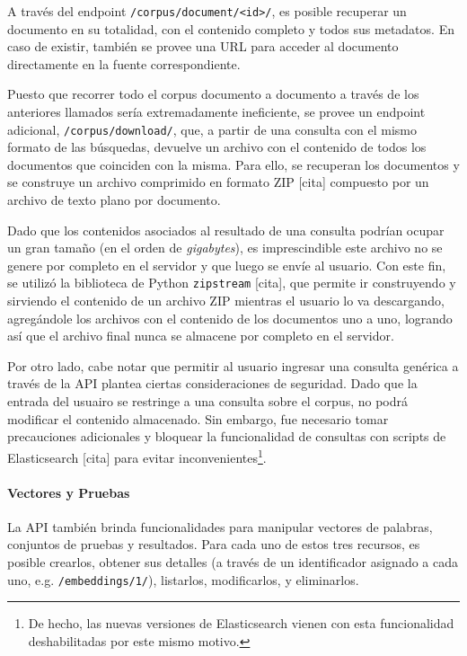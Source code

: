 A través del endpoint \texttt{/corpus/document/<id>/}, es posible recuperar un documento en su
totalidad, con el contenido completo y todos sus metadatos. En caso de existir, también se provee
una URL para acceder al documento directamente en la fuente correspondiente.

Puesto que recorrer todo el corpus documento a documento a través de los anteriores llamados sería
extremadamente ineficiente, se provee un endpoint adicional, \texttt{/corpus/download/}, que, a
partir de una consulta con el mismo formato de las búsquedas, devuelve un archivo con el contenido
de todos los documentos que coinciden con la misma. Para ello, se recuperan los documentos y se
construye un archivo comprimido en formato ZIP [cita] compuesto por un archivo de texto plano por
documento.

Dado que los contenidos asociados al resultado de una consulta podrían ocupar un gran tamaño (en el
orden de \textit{gigabytes}), es imprescindible este archivo no se genere por completo en el
servidor y que luego se envíe al usuario. Con este fin, se utilizó la biblioteca de Python
\texttt{zipstream} [cita], que permite ir construyendo y sirviendo el contenido de un archivo ZIP
mientras el usuario lo va descargando, agregándole los archivos con el contenido de los documentos
uno a uno, logrando así que el archivo final nunca se almacene por completo en el servidor.


Por otro lado, cabe notar que permitir al usuario ingresar una consulta genérica a través de la API
plantea ciertas consideraciones de seguridad. Dado que la entrada del usuairo se restringe a una
consulta sobre el corpus, no podrá modificar el contenido almacenado. Sin embargo, fue necesario
tomar precauciones adicionales y bloquear la funcionalidad de consultas con scripts de Elasticsearch
[cita] para evitar inconvenientes\footnote{De hecho, las nuevas versiones de Elasticsearch vienen
con esta funcionalidad deshabilitadas por este mismo motivo.}.


\paragraph{Vectores y Pruebas}

La API también brinda funcionalidades para manipular vectores de palabras, conjuntos de pruebas y
resultados. Para cada uno de estos tres recursos, es posible crearlos, obtener sus detalles (a
través de un identificador asignado a cada uno, e.g. \texttt{/embeddings/1/}), listarlos,
modificarlos, y eliminarlos.

